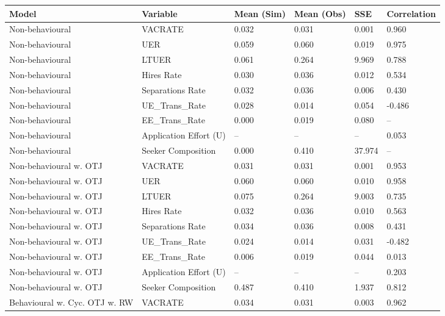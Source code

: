 \begin{table}[ht]
\centering
\begin{adjustbox}{width=\textwidth}
\begin{tabular}{llllll}
\toprule
Model & Variable & Mean (Sim) & Mean (Obs) & SSE & Correlation \\
\midrule
Non-behavioural & VACRATE & 0.032 & 0.031 & \cellcolor{yellow!25}0.001 & 0.960 \\
Non-behavioural & UER & 0.059 & 0.060 & 0.019 & \cellcolor{yellow!25}0.975 \\
Non-behavioural & LTUER & 0.061 & 0.264 & 9.969 & 0.788 \\
Non-behavioural & Hires Rate & 0.030 & 0.036 & 0.012 & 0.534 \\
Non-behavioural & Separations Rate & 0.032 & 0.036 & \cellcolor{yellow!25}0.006 & 0.430 \\
Non-behavioural & UE_Trans_Rate & 0.028 & 0.014 & 0.054 & -0.486 \\
Non-behavioural & EE_Trans_Rate & 0.000 & 0.019 & 0.080 & -- \\
Non-behavioural & Application Effort (U) & -- & -- & -- & 0.053 \\
Non-behavioural & Seeker Composition & 0.000 & 0.410 & 37.974 & -- \\
Non-behavioural w. OTJ & VACRATE & \cellcolor{yellow!25}0.031 & 0.031 & 0.001 & 0.953 \\
Non-behavioural w. OTJ & UER & \cellcolor{yellow!25}0.060 & 0.060 & \cellcolor{yellow!25}0.010 & 0.958 \\
Non-behavioural w. OTJ & LTUER & 0.075 & 0.264 & 9.003 & 0.735 \\
Non-behavioural w. OTJ & Hires Rate & \cellcolor{yellow!25}0.032 & 0.036 & \cellcolor{yellow!25}0.010 & 0.563 \\
Non-behavioural w. OTJ & Separations Rate & \cellcolor{yellow!25}0.034 & 0.036 & 0.008 & 0.431 \\
Non-behavioural w. OTJ & UE_Trans_Rate & 0.024 & 0.014 & 0.031 & -0.482 \\
Non-behavioural w. OTJ & EE_Trans_Rate & 0.006 & 0.019 & 0.044 & 0.013 \\
Non-behavioural w. OTJ & Application Effort (U) & -- & -- & -- & 0.203 \\
Non-behavioural w. OTJ & Seeker Composition & 0.487 & 0.410 & 1.937 & \cellcolor{yellow!25}0.812 \\
Behavioural w. Cyc. OTJ w. RW & VACRATE & 0.034 & 0.031 & 0.003 & 0.962 \\

\end{tabular}
\end{adjustbox}
\end{table}
